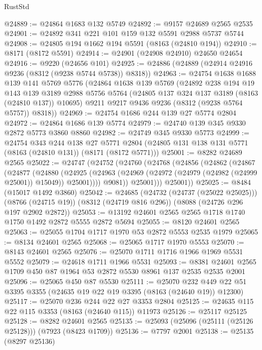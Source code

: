 \begin{lexlean}{RustStd}
\begin{coremodule}
@24889 := @24864 @1683 @132 @5749
@24892 := @9157 @24689 @2565 @2535
@24901 := @24892 @341 @221 @101 @159 @132 @5591 @2988 @5737 @5744
@24908 := @24805 @194 @1662 @194 @5591 (@8163 (@24810 @194))
@24910 := @8171 (@8172 @5591)
@24914 := @24901 (@24908 @24910) @24650 @24654
@24916 := @9220 (@24656 @101)
@24925 := @24886 (@24889 (@24914 @24916 @9236 (@8312 (@9238 @5744 @5738)) @8318))
@24963 := @24754
    @1638
    @1688
    @139
    @141
    @5769
    @5776
    (@24864
      @1638
      @139
      @5769
      (@24892
        @238
        @194
        @19
        @143
        @139
        @3189
        @2988
        @5756
        @5764
        (@24805 @137 @324 @137 @3189 (@8163 (@24810 @137)) @10695)
        @9211
        @9217
        @9436
        @9236
        (@8312 (@9238 @5764 @5757))
        @8318))
@24969 := @24754 @1686 @244 @139 @27 @5774 @2804
@24972 := @24864 @1686 @139 @5774
@24979 := @24740 @139 @345 @9330 @2872 @5773 @3860 @8860
@24982 := @24749 @345 @9330 @5773
@24999 := @24754
    @343
    @244
    @138
    @27
    @5771
    @2804
    (@24805 @131 @138 @131 @5771 (@8163 (@24810 @131)) (@8171 (@8172 @5771)))
@25001 := @8282 @24689 @2565
@25022 := @24747
    (@24752
      (@24760
        (@24768
          (@24856
            (@24862
              (@24867
                (@24877
                  (@24880
                    (@24925
                      (@24963 (@24969 (@24972 (@24979 (@24982 (@24999 @25001)) @15049)) @25001))))
                  @9081))
              @25001)))
        @25001))
@25025 := @8484 (@15017 @1492 @3860)
@25042 := @24685
    (@24732 (@24737 (@25022 @25025)))
    (@8766 (@24715 @19))
    (@8312 (@24719 @816 @296))
    (@8088 (@24726 @296 @197 @2902 @2872))
@25053 := @13192 @24601 @2565 @2565 @1718 @1740 @1750 @1492 @2872 @5555 @2872 @5694
@25055 := @8120 @24601 @2565
@25063 := @25055 @1704 @1717 @1970 @53 @2872 @5553 @2535 @1979
@25065 := @8134 @24601 @2565
@25068 := @25065 @1717 @1970 @5553
@25070 := @8143 @24601 @2565
@25076 := @25070 @1711 @1716 @1966 @1969 @5531 @5552
@25079 := @24618 @1711 @1966 @5531
@25093 := @8381 @24601 @2565 @1709 @450 @87 @1964 @53 @2872 @5530 @8961 @137 @2535 @2535 @2001
@25096 := @25065 @450 @87 @5530
@25111 := @25070
    @232
    @449
    @22
    @51
    @3395
    @3355
    (@24635 @19 @22 @19 @3395 (@8163 (@24640 @19)) @12300)
@25117 := @25070 @236 @244 @22 @27 @3353 @2804
@25125 := @24635 @115 @22 @115 @3353 (@8163 (@24640 @115)) @11973
@25126 := @25117 @25125
@25128 := @8282 @24601 @2565
@25135 := @25093 (@25096 (@25111 (@25126 @25128))) (@7923 (@8423 @1709))
@25136 := @7797 @2001
@25138 := @25135 (@8297 @25136)

\end{coremodule}
\end{lexlean}
